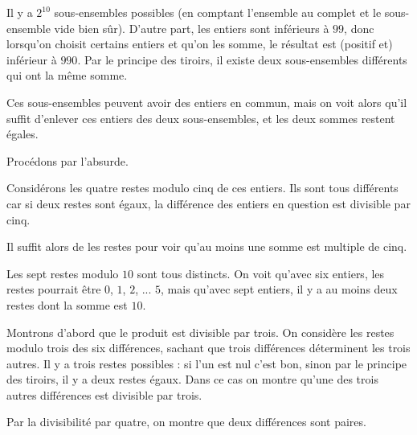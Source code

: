 \begin{Soln}{15}
Il y a $2^{10}$ sous-ensembles possibles (en comptant l'ensemble au complet et le sous-ensemble vide bien sûr). D'autre part, les entiers sont inférieurs à $99$, donc lorsqu'on choisit certains entiers et qu'on les somme, le résultat est (positif et) inférieur à $990$. Par le principe des tiroirs, il existe deux sous-ensembles différents qui ont la même somme.

Ces sous-ensembles peuvent avoir des entiers en commun, mais on voit alors qu'il suffit d'enlever ces entiers des deux sous-ensembles, et les deux sommes restent égales.
\end{Soln}
\begin{Soln}{16}
Procédons par l'absurde.

Considérons les quatre restes modulo cinq de ces entiers. Ils sont tous différents car si deux restes sont égaux, la différence des entiers en question est divisible par cinq.

Il suffit alors de les restes pour voir qu'au moins une somme est multiple de cinq.
\end{Soln}
\begin{Soln}{17}
Les sept restes modulo $10$ sont tous distincts. On voit qu'avec six entiers, les restes pourrait être $0$, $1$, $2$, ... $5$, mais qu'avec sept entiers, il y a au moins deux restes dont la somme est $10$.
\end{Soln}
\begin{Soln}{18}
Montrons d'abord que le produit est divisible par trois.
On considère les restes modulo trois des six différences, sachant que trois différences déterminent les trois autres. Il y a trois restes possibles : si l'un est nul  c'est bon, sinon par le principe des tiroirs, il y a deux restes égaux. Dans ce cas on montre qu'une des trois autres différences est divisible par trois.

Par la divisibilité par quatre, on montre que deux différences sont paires.

\end{Soln}
